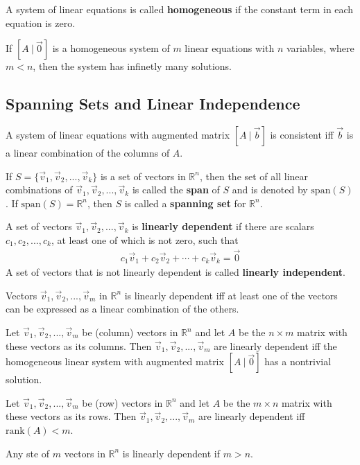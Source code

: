 \documentclass{article}
\begin{document}
\begin{definition}
	A system of linear equations is called \textbf{homogeneous} if the constant term in each equation is zero.
\end{definition}
\begin{theorem}
	If $[A\:|\:\vec 0]$ is a homogeneous system of $m$ linear equations with $n$ variables, where $m < n$, then the system has infinetly many solutions.
\end{theorem}
\subsection{Spanning Sets and Linear Independence}
\begin{theorem}
	A system of linear equations with augmented matrix $[A\:|\:\vec b]$ is consistent iff $\vec b$ is a linear combination of the columns of $A$.
\end{theorem}
\begin{definition}
	If $S=\{\vec v_1, \vec v_2, ..., \vec v_k\}$ is a set of vectors in $\mathbb{R}^n$, then the set of all linear combinations of $\vec v_1, \vec v_2, ..., \vec v_k$ is called the \textbf{span} of $S$ and is denoted by $\text{span}(S)$. If $\text{span}(S)=\mathbb{R}^n$, then $S$ is called a \textbf{spanning set} for $\mathbb{R}^n$.
\end{definition}
\begin{definition}
	A set of vectors $\vec v_1, \vec v_2, ..., \vec v_k$ is \textbf{linearly dependent} if there are scalars $c_1, c_2, ..., c_k$, at least one of which is not zero, such that
	\begin{gather*}
		c_1\vec v_1 + c_2\vec v_2 + \cdots + c_k\vec v_k = \vec 0
	\end{gather*}
	A set of vectors that is not linearly dependent is called \textbf{linearly independent}.
\end{definition}
\begin{theorem}
	Vectors $\vec v_1, \vec v_2, ..., \vec v_m$ in $\mathbb{R}^n$ is linearly dependent iff at least one of the vectors can be expressed as a linear combination of the others.
\end{theorem}
\begin{theorem}
	Let $\vec v_1, \vec v_2, ..., \vec v_m$ be (column) vectors in $\mathbb{R}^n$ and let $A$ be the $n\times m$ matrix with these vectors as its columns. Then $\vec v_1, \vec v_2, ..., \vec v_m$ are linearly dependent iff the homogeneous linear system with augmented matrix $[A\:|\:\vec 0]$ has a nontrivial solution.
\end{theorem}
\begin{theorem}
	Let $\vec v_1, \vec v_2, ..., \vec v_m$ be (row) vectors in $\mathbb{R}^n$ and let $A$ be the $m\times n$ matrix with these vectors as its rows. Then $\vec v_1, \vec v_2, ..., \vec v_m$ are linearly dependent iff $\text{rank}(A) < m$.
\end{theorem}
\begin{theorem}
	Any ste of $m$ vectors in $\mathbb{R}^n$ is linearly dependent if $m > n$.
\end{theorem}
\end{document}
